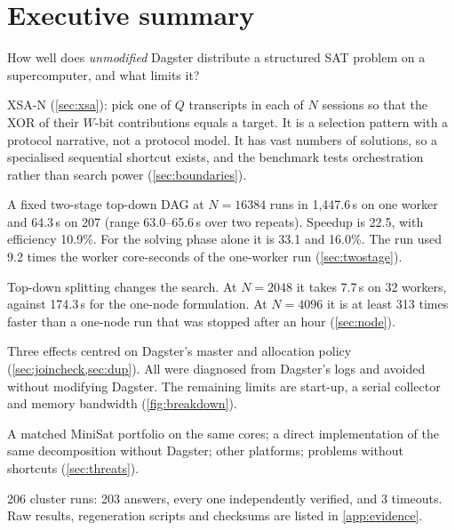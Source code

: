 \documentclass[11pt,a4paper]{article}
\newcommand{\XSA}{\textsf{XSA-N}}
\begin{document}
\section{Executive summary}
\label{sec:exec}
\begin{description}[style=nextline, leftmargin=1.2em, font=\normalfont\bfseries]
\item[Question] How well does \emph{unmodified} Dagster distribute a structured SAT problem
  on a supercomputer, and what limits it?
\item[Benchmark, and its limits] \XSA{} (\cref{sec:xsa}): pick one of $Q$ transcripts in each
  of $N$ sessions so that the XOR of their $W$-bit contributions equals a target. It is a
  selection pattern with a protocol narrative, not a protocol model. It has vast numbers of
  solutions, so a specialised sequential shortcut exists, and the benchmark tests
  orchestration rather than search power (\cref{sec:boundaries}).
\item[Headline: strict strong scaling] A fixed two-stage top-down DAG at $N=16384$ runs in
  1{,}447.6\,s on one worker and 64.3\,s on 207 (range 63.0--65.6\,s over two repeats). Speedup
  is 22.5, with efficiency 10.9\%. For the solving phase alone it is 33.1 and 16.0\%. The run
  used 9.2 times the worker core-seconds of the one-worker run (\cref{sec:twostage}).
\item[Algorithmic gain (not a scaling result)] Top-down splitting changes the search. At
  $N=2048$ it takes 7.7\,s on 32 workers, against 174.3\,s for the one-node formulation. At
  $N=4096$ it is at least 313 times faster than a one-node run that was stopped after an hour
  (\cref{sec:node}).
\item[What limited scaling] Three effects centred on Dagster's master and allocation policy
  (\cref{sec:joincheck,sec:dup}). All were diagnosed from Dagster's logs and avoided without
  modifying Dagster. The remaining limits are start-up, a serial collector and memory
  bandwidth (\cref{fig:breakdown}).
\item[Not yet tested] A matched MiniSat portfolio on the same cores; a direct implementation
  of the same decomposition without Dagster; other platforms; problems without shortcuts
  (\cref{sec:threats}).
\item[Evidence] 206 cluster runs: 203 answers, every one independently verified, and 3
  timeouts. Raw results, regeneration scripts and checksums are listed in
  \cref{app:evidence}.
\end{description}
\end{document}
